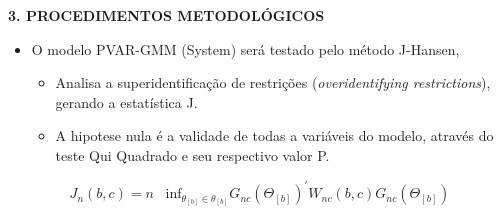 \documentclass[
  ignorenonframetext,
  aspectratio=169,
  ignorenonframetext]{beamer}
\providecommand{\tightlist}{%
  \setlength{\itemsep}{0pt}\setlength{\parskip}{0pt}}
\begin{document}
\begin{frame}{\textbf{3. PROCEDIMENTOS METODOLÓGICOS}}
\protect\hypertarget{procedimentos-metodoluxf3gicos-9}{}
\begin{itemize}
\tightlist
\item
  O modelo PVAR-GMM (System) será testado pelo método J-Hansen,

  \begin{itemize}
  \tightlist
  \item
    Analisa a superidentificação de restrições (\emph{overidentifying
    restrictions}), gerando a estatística J.
  \item
    A hipotese nula é a validade de todas a variáveis do modelo, através
    do teste Qui Quadrado e seu respectivo valor P.
  \end{itemize}
\end{itemize}

\begin{equation}\label{eq:jhansen}
J_{n}(b,c) = n \hspace{10pt} \text{inf}_{\theta_{[b]} \in \theta_{[b]}} G_{nc} (\Theta_{[b]})^{'}W_{nc}(b,c)G_{nc}(\Theta_{[b]}) 
\end{equation}
\end{frame}
\end{document}
